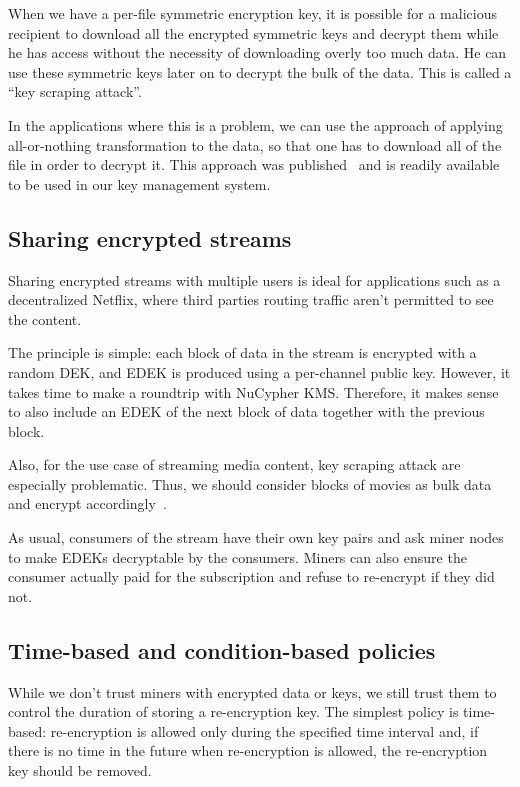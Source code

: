 \documentclass[longbibliography,nofootinbib]{revtex4-1}
\newcommand{\kms}{NuCypher KMS}
\begin{document}
\begin{CJK*}{UTF8}{gbsn}
When we have a per-file symmetric encryption key, it is possible for a malicious recipient to download all the encrypted symmetric keys and decrypt them
while he has access without the necessity of downloading overly too much data.
He can use these symmetric keys later on to decrypt the bulk of the data.
This is called a ``key scraping attack''.

In the applications where this is a problem, we can use the approach of applying all-or-nothing transformation to the data, so that one has to download all of the
file in order to decrypt it.
This approach was published~\cite{aont-bulk} and is readily available to be used in our key management system.

\subsection{Sharing encrypted streams}

Sharing encrypted streams with multiple users is ideal for applications such as a decentralized Netflix, where third parties routing traffic
aren't permitted to see the content.

The principle is simple: each block of data in the stream is encrypted with a random DEK, and EDEK is produced using a per-channel public key.
However, it takes time to make a roundtrip with \kms.
Therefore, it makes sense to also include an EDEK of the next block of data together with the previous block.

Also, for the use case of streaming media content, key scraping attack are especially problematic.
Thus, we should consider blocks of movies as bulk data and encrypt accordingly~\cite{aont-bulk}.

As usual, consumers of the stream have their own key pairs and ask miner nodes to make EDEKs decryptable by the consumers.
Miners can also ensure the consumer actually paid for the subscription and refuse to re-encrypt if they did not.

\subsection{Time-based and condition-based policies}

While we don't trust miners with encrypted data or keys, we still trust them to control the duration of storing a re-encryption key.
The simplest policy is time-based: re-encryption is allowed only during the specified time interval and, if there is no time in the future when
re-encryption is allowed, the re-encryption key should be removed.


\end{CJK*}
\end{document}
